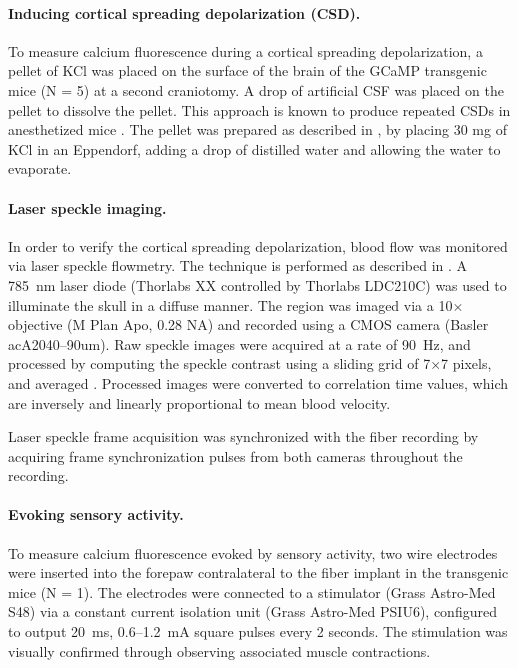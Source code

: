 \paragraph{Inducing cortical spreading depolarization (CSD).} To measure calcium 
fluorescence during a cortical spreading depolarization, a pellet of 
KCl was placed on the surface of the brain of the GCaMP transgenic 
mice (N = 5) at a second craniotomy. A drop of artificial CSF was 
placed on the pellet to dissolve the pellet. This approach is known to
 produce repeated CSDs in anesthetized mice \cite{Karatas:2013ir}. The
 pellet was prepared as described in \cite{Karatas:2013ir}, by placing
 30 mg of KCl in an Eppendorf, adding a drop of distilled water and 
allowing the water to evaporate.



\paragraph{Laser speckle imaging.} In order to verify the cortical spreading 
depolarization, blood flow was monitored via laser speckle flowmetry. 
The technique is performed as described in 
\cite{Dunn:2001dj,Karatas:2013ir}. A 785~\si{\nano\meter} laser diode 
(Thorlabs XX controlled by Thorlabs LDC210C) was used to illuminate 
the skull in a diffuse manner. The region was imaged via a 10$\times$ 
objective (M Plan Apo, 0.28 NA) and recorded using a CMOS camera 
(Basler acA2040--90um). Raw speckle images were acquired at a rate of 
90~\si{\hertz}, and processed by computing the speckle contrast using 
a sliding grid of 7$\times$7 pixels, and averaged \cite{Tom:2008hm}. 
Processed images were converted to correlation time values, which are 
inversely and linearly proportional to mean blood velocity.



Laser speckle frame acquisition was synchronized with the fiber 
recording by acquiring frame synchronization pulses from both cameras 
throughout the recording.



\paragraph{Evoking sensory activity.} To measure calcium fluorescence evoked by 
sensory activity, two wire electrodes were inserted into the forepaw 
contralateral to the fiber implant in the transgenic mice (N = 1). The
 electrodes were connected to a stimulator (Grass Astro-Med S48) via a
 constant current isolation unit (Grass Astro-Med PSIU6), configured 
to output 20~ms, 0.6--1.2~\si{\milli\ampere} square pulses every 2 
seconds. The stimulation was visually confirmed through observing 
associated muscle contractions.



